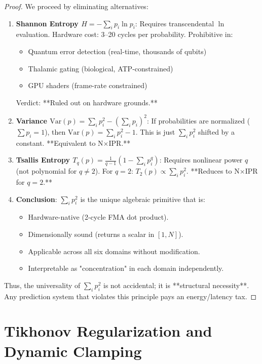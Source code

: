 \documentclass[11pt,oneside]{article}
\theoremstyle{definition}
\begin{document}
\begin{proof}
We proceed by eliminating alternatives:

\begin{enumerate}
  \item \textbf{Shannon Entropy $H = -\sum_i p_i \ln p_i$}: Requires transcendental $\ln$ evaluation. Hardware cost: 3--20 cycles per probability. Prohibitive in:
  \begin{itemize}
    \item Quantum error detection (real-time, thousands of qubits)
    \item Thalamic gating (biological, ATP-constrained)
    \item GPU shaders (frame-rate constrained)
  \end{itemize}
  Verdict: **Ruled out on hardware grounds.**

  \item \textbf{Variance $\text{Var}(p) = \sum_i p_i^2 - (\sum_i p_i)^2$}: If probabilities are normalized ($\sum p_i = 1$), then $\text{Var}(p) = \sum_i p_i^2 - 1$. This is just $\sum_i p_i^2$ shifted by a constant. **Equivalent to N\ensuremath{\times}IPR.**

  \item \textbf{Tsallis Entropy $T_q(p) = \frac{1}{q-1}(1 - \sum_i p_i^q)$}: Requires nonlinear power $q$ (not polynomial for $q \neq 2$). For $q=2$: $T_2(p) \propto \sum_i p_i^2$. **Reduces to N\ensuremath{\times}IPR for $q=2$.**

  \item \textbf{Conclusion}: $\sum_i p_i^2$ is the unique algebraic primitive that is:
  \begin{itemize}
    \item Hardware-native (2-cycle FMA dot product).
    \item Dimensionally sound (returns a scalar in $[1, N]$).
    \item Applicable across all six domains without modification.
    \item Interpretable as "concentration" in each domain independently.
  \end{itemize}
\end{enumerate}

Thus, the universality of $\sum_i p_i^2$ is not accidental; it is **structural necessity**. Any prediction system that violates this principle pays an energy/latency tax.
\end{proof}

\section{Tikhonov Regularization and Dynamic Clamping}
\end{document}

